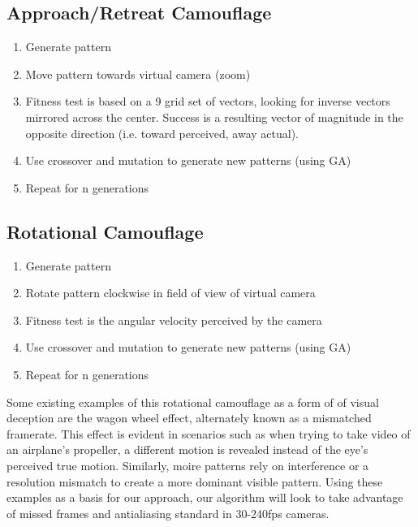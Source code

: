 \documentclass[12pt,letter]{article}
\begin{document}
\subsection{Approach/Retreat Camouflage}
\begin{enumerate}
\item Generate pattern
\item Move pattern towards virtual camera (zoom)
\item Fitness test is based on a 9 grid set of vectors, looking for inverse vectors mirrored across the center. Success is a resulting vector of magnitude in the opposite direction (i.e. toward perceived, away actual). 
\item Use crossover and mutation to generate new patterns (using GA)
\item Repeat for n generations
\end{enumerate}

\subsection{Rotational Camouflage}
\begin{enumerate}
\item Generate pattern
\item Rotate pattern clockwise in field of view of virtual camera
\item Fitness test is the angular velocity perceived by the camera
\item Use crossover and mutation to generate new patterns (using GA)
\item Repeat for n generations
\end{enumerate}

Some existing examples of this rotational camouflage as a form of of visual deception are the wagon wheel effect, alternately known as a mismatched framerate. This effect is evident in scenarios such as when trying to take video of an airplane's propeller, a different motion is revealed instead of the eye's perceived true motion. Similarly, moire patterns rely on interference or a resolution mismatch to create a more dominant visible pattern. Using these examples as a basis for our approach, our algorithm will look to take advantage of missed frames and antialiasing standard in 30-240fps cameras.
\end{document}
